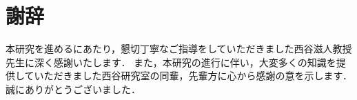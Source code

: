 \section{謝辞}
本研究を進めるにあたり，懇切丁寧なご指導をしていただきました西谷滋人教授先生に深く感謝いたします． また，本研究の進行に伴い，大変多くの知識を提供していただきました西谷研究室の同輩，先輩方に心から感謝の意を示します． 誠にありがとうございました．


